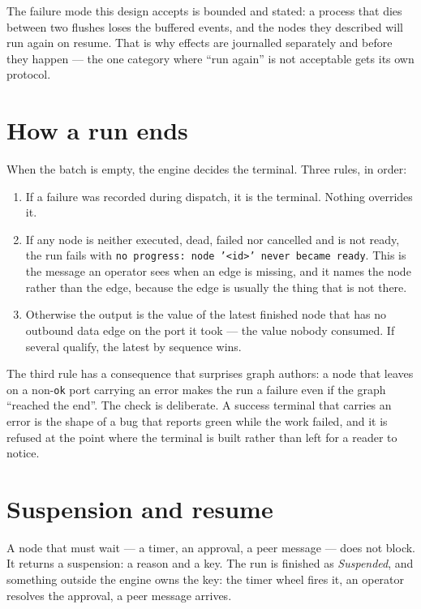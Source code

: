 The failure mode this design accepts is bounded and stated: a process that dies between two flushes
loses the buffered events, and the nodes they described will run again on resume. That is why
effects are journalled separately and before they happen --- the one category where \enquote{run
again} is not acceptable gets its own protocol.

\section{How a run ends}

When the batch is empty, the engine decides the terminal. Three rules, in order:

\begin{enumerate}
	\item If a failure was recorded during dispatch, it is the terminal. Nothing overrides it.
	\item If any node is neither executed, dead, failed nor cancelled and is not ready, the run fails
	with \texttt{no progress: node '<id>' never became ready}. This is the message an operator sees
	when an edge is missing, and it names the node rather than the edge, because the edge is usually
	the thing that is not there.
	\item Otherwise the output is the value of the latest finished node that has no outbound data
	edge on the port it took --- the value nobody consumed. If several qualify, the latest by
	sequence wins.
\end{enumerate}

The third rule has a consequence that surprises graph authors: a node that leaves on a
non-\texttt{ok} port carrying an error makes the run a failure even if the graph \enquote{reached
the end}. The check
is deliberate. A success terminal that carries an error is the shape of a bug that reports green
while the work failed, and it is refused at the point where the terminal is built rather than left
for a reader to notice.

\section{Suspension and resume}

A node that must wait --- a timer, an approval, a peer message --- does not block. It returns a
suspension: a reason and a key. The run is finished as \emph{Suspended}, and something outside the
engine owns the key: the timer wheel fires it, an operator resolves the approval, a peer message
arrives.

